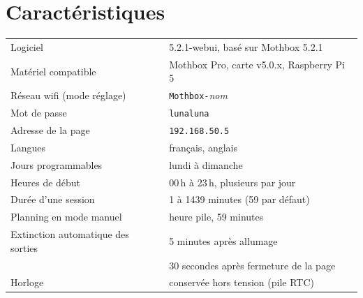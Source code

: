 \documentclass[10pt,a4paper]{article}
\begin{document}
\begin{minipage}[t]{0.43\textwidth}
\vspace{0pt}
\section{Caractéristiques}
\small
\begin{tabularx}{\linewidth}{@{}>{\raggedright\arraybackslash}p{4.2cm}L@{}}
\toprule
Logiciel & 5.2.1-webui, basé sur Mothbox 5.2.1 \\
Matériel compatible & Mothbox Pro, carte v5.0.x, Raspberry Pi 5 \\
\midrule
Réseau wifi (mode réglage) & \texttt{Mothbox-}\textit{nom} \\
Mot de passe & \texttt{lunaluna} \\
Adresse de la page & \texttt{192.168.50.5} \\
Langues & français, anglais \\
\midrule
Jours programmables & lundi à dimanche \\
Heures de début & 00\,h à 23\,h, plusieurs par jour \\
Durée d'une session & 1 à 1439 minutes (59 par défaut) \\
Planning en mode manuel & heure pile, 59 minutes \\
\midrule
Extinction automatique des sorties & 5 minutes après allumage \\
 & 30 secondes après fermeture de la page \\
Horloge & conservée hors tension (pile RTC) \\
\bottomrule
\end{tabularx}
\end{minipage}
\end{document}
